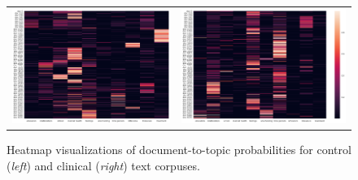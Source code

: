 \documentclass[12pt]{article}
\begin{document}
\begin{figure} [htbp]
	\begin{tabular}{c c}
		\begin{minipage}{0.47\textwidth}
			\includegraphics[width=\textwidth]{control_doc2topic}
		\end{minipage}
		&
		\begin{minipage}{0.50\textwidth}
			\includegraphics[width=\textwidth]{clinical_doc2topic}
		\end{minipage}
	\end{tabular}
	\caption{Heatmap visualizations of document-to-topic probabilities for control (\textit{left}) and clinical (\textit{right}) text corpuses. }
	\label{fig:doc2topic_heatmaps}
\end{figure}
\end{document}
